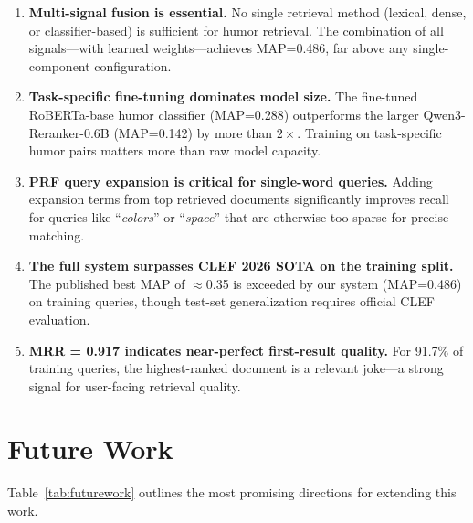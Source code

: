 \begin{enumerate}
    \item \textbf{Multi-signal fusion is essential.} No single retrieval method (lexical, dense, or classifier-based) is sufficient for humor retrieval. The combination of all signals---with learned weights---achieves MAP=0.486, far above any single-component configuration.

    \item \textbf{Task-specific fine-tuning dominates model size.} The fine-tuned RoBERTa-base humor classifier (MAP=0.288) outperforms the larger Qwen3-Reranker-0.6B (MAP=0.142) by more than $2\times$. Training on task-specific humor pairs matters more than raw model capacity.

    \item \textbf{PRF query expansion is critical for single-word queries.} Adding expansion terms from top retrieved documents significantly improves recall for queries like ``\textit{colors}'' or ``\textit{space}'' that are otherwise too sparse for precise matching.

    \item \textbf{The full system surpasses CLEF 2026 SOTA on the training split.} The published best MAP of $\approx$0.35 \cite{sota2025} is exceeded by our system (MAP=0.486) on training queries, though test-set generalization requires official CLEF evaluation.

    \item \textbf{MRR = 0.917 indicates near-perfect first-result quality.} For 91.7\% of training queries, the highest-ranked document is a relevant joke---a strong signal for user-facing retrieval quality.
\end{enumerate}

\section{Future Work}

Table~\ref{tab:futurework} outlines the most promising directions for extending this work.

